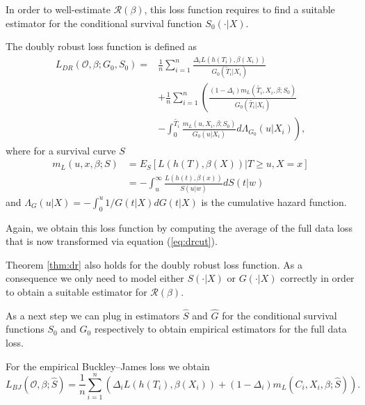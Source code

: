 \documentclass[12pt, a4paper]{scrartcl}
\theoremstyle{definition}
\theoremstyle{plain}
\numberwithin{equation}{section}
\numberwithin{figure}{section}
\numberwithin{table}{section}
\begin{document}
	In order to well-estimate $\mathcal{R}(\beta)$, this loss function requires to find a suitable estimator for the conditional survival function $S_0(\cdot\vert X)$.
	
	The doubly robust loss function is defined as
	\begin{equation}\label{eq:dr}
	\begin{split}
		L_{DR}(\mathcal{O}, \beta; G_0, S_0) = & \frac{1}{n} \sum_{i=1}^n \frac{\Delta_i L(h(T_i),\beta(X_i))}{G_0(\tilde{T}_i\vert X_i)}\\
		~ & + \frac{1}{n} \sum_{i=1}^n \left(\frac{(1-\Delta_i)m_L(\tilde{T_i}, X_i, \beta; S_0)}{G_0(\tilde{T_i}\vert X_i)} \right.\\
		& - \left. \int _0^{\tilde{T_i}} \frac{m_L(u, X_i, \beta; S_0)}{G_0(u \vert X_i)} d \Lambda_{G_0}(u \vert X_i) \right),
	\end{split}
	\end{equation}
	where for a survival curve $S$
	\begin{equation}\label{eq:exploss}
	\begin{split}
		m_L(u,x,\beta; S) &= E_S[L(h(T), \beta(X)) \vert T \geq u, X = x]\\
		&= - \int_u^{\infty} \frac{L(h(t), \beta(x))}{S(u \vert w)} dS(t\vert w)
	\end{split}
	\end{equation}
	and $\Lambda_G(u\vert X) = - \int_0^u  1/ G(t\vert X)dG(t \vert X)$ is the cumulative hazard function.
	
	Again, we obtain this loss function by computing the average of the full data loss that is now transformed via equation (\ref{eq:drcut}).
	
	Theorem \ref{thm:dr} also holds for the doubly robust loss function.
	As a consequence we only need to model either $S(\cdot\vert X)$ or $G(\cdot\vert X)$ correctly in order to obtain a suitable estimator for $\mathcal{R}(\beta)$.
	
	As a next step we can plug in estimators $\hat{S}$ and $\hat{G}$ for the conditional survival functions $S_0$ and $G_0$ respectively to obtain empirical estimators for the full data loss.
	
	For the empirical Buckley--James loss we obtain
	\begin{equation*}
	L_{BJ}(\mathcal{O}, \beta; \hat{S}) = \frac{1}{n} \sum_{i=1}^n \left( \Delta_i L(h(T_i), \beta(X_i))+(1-\Delta_i)m_L(C_i, X_i, \beta; \hat{S})\right).
	\end{equation*}
	
\end{document}
